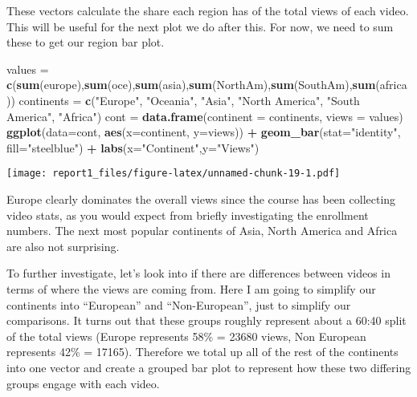 \documentclass[
]{article}
\newenvironment{Shaded}{\begin{snugshade}}{\end{snugshade}}
\newcommand{\DataTypeTok}[1]{\textcolor[rgb]{0.13,0.29,0.53}{#1}}
\newcommand{\KeywordTok}[1]{\textcolor[rgb]{0.13,0.29,0.53}{\textbf{#1}}}
\newcommand{\NormalTok}[1]{#1}
\newcommand{\OperatorTok}[1]{\textcolor[rgb]{0.81,0.36,0.00}{\textbf{#1}}}
\newcommand{\StringTok}[1]{\textcolor[rgb]{0.31,0.60,0.02}{#1}}
\begin{document}
These vectors calculate the share each region has of the total views of
each video. This will be useful for the next plot we do after this. For
now, we need to sum these to get our region bar plot.

\begin{Shaded}
\begin{Highlighting}[]
\NormalTok{values =}\StringTok{ }\KeywordTok{c}\NormalTok{(}\KeywordTok{sum}\NormalTok{(europe),}\KeywordTok{sum}\NormalTok{(oce),}\KeywordTok{sum}\NormalTok{(asia),}\KeywordTok{sum}\NormalTok{(NorthAm),}\KeywordTok{sum}\NormalTok{(SouthAm),}\KeywordTok{sum}\NormalTok{(africa))}
\NormalTok{continents =}\StringTok{ }\KeywordTok{c}\NormalTok{(}\StringTok{"Europe"}\NormalTok{, }\StringTok{"Oceania"}\NormalTok{, }\StringTok{"Asia"}\NormalTok{, }
               \StringTok{"North America"}\NormalTok{, }\StringTok{"South America"}\NormalTok{, }\StringTok{"Africa"}\NormalTok{)}
\NormalTok{cont =}\StringTok{ }\KeywordTok{data.frame}\NormalTok{(}\DataTypeTok{continent =}\NormalTok{ continents, }\DataTypeTok{views =}\NormalTok{ values)}
\KeywordTok{ggplot}\NormalTok{(}\DataTypeTok{data=}\NormalTok{cont, }\KeywordTok{aes}\NormalTok{(}\DataTypeTok{x=}\NormalTok{continent, }\DataTypeTok{y=}\NormalTok{views)) }\OperatorTok{+}\StringTok{ }
\StringTok{  }\KeywordTok{geom_bar}\NormalTok{(}\DataTypeTok{stat=}\StringTok{"identity"}\NormalTok{, }\DataTypeTok{fill=}\StringTok{"steelblue"}\NormalTok{) }\OperatorTok{+}\StringTok{ }
\StringTok{  }\KeywordTok{labs}\NormalTok{(}\DataTypeTok{x=}\StringTok{"Continent"}\NormalTok{,}\DataTypeTok{y=}\StringTok{"Views"}\NormalTok{)}
\end{Highlighting}
\end{Shaded}

\texttt{[image: report1\_files/figure-latex/unnamed-chunk-19-1.pdf]}

Europe clearly dominates the overall views since the course has been
collecting video stats, as you would expect from briefly investigating
the enrollment numbers. The next most popular continents of Asia, North
America and Africa are also not surprising.

To further investigate, let's look into if there are differences between
videos in terms of where the views are coming from. Here I am going to
simplify our continents into ``European'' and ``Non-European'', just to
simplify our comparisons. It turns out that these groups roughly
represent about a 60:40 split of the total views (Europe represents 58\%
= 23680 views, Non European represents 42\% = 17165). Therefore we total
up all of the rest of the continents into one vector and create a
grouped bar plot to represent how these two differing groups engage with
each video.
\end{document}
